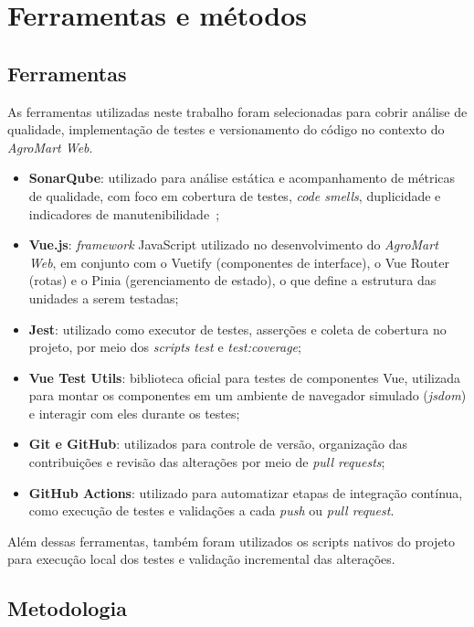 ﻿\chapter{Ferramentas e métodos}

\section{Ferramentas}

As ferramentas utilizadas neste trabalho foram selecionadas para cobrir análise de qualidade, implementação de testes e versionamento do código no contexto do \textit{AgroMart Web}.

\begin{itemize}
	\item \textbf{SonarQube}: utilizado para análise estática e acompanhamento de métricas de qualidade, com foco em cobertura de testes, \textit{code smells}, duplicidade e indicadores de manutenibilidade~\cite{sonarqube};
	\item \textbf{Vue.js}: \textit{framework} JavaScript utilizado no desenvolvimento do \textit{AgroMart Web}, em conjunto com o Vuetify (componentes de interface), o Vue Router (rotas) e o Pinia (gerenciamento de estado), o que define a estrutura das unidades a serem testadas;
	\item \textbf{Jest}: utilizado como executor de testes, asserções e coleta de cobertura no projeto, por meio dos \textit{scripts} \textit{test} e \textit{test:coverage};
	\item \textbf{Vue Test Utils}: biblioteca oficial para testes de componentes Vue, utilizada para montar os componentes em um ambiente de navegador simulado (\textit{jsdom}) e interagir com eles durante os testes;
	\item \textbf{Git e GitHub}: utilizados para controle de versão, organização das contribuições e revisão das alterações por meio de \textit{pull requests};
	\item \textbf{GitHub Actions}: utilizado para automatizar etapas de integração contínua, como execução de testes e validações a cada \textit{push} ou \textit{pull request}.
\end{itemize}

Além dessas ferramentas, também foram utilizados os scripts nativos do projeto para execução local dos testes e validação incremental das alterações.

\section{Metodologia}

